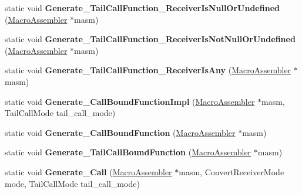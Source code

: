 \begin{DoxyCompactItemize}
\item 
static void {\bfseries Generate\+\_\+\+Tail\+Call\+Function\+\_\+\+Receiver\+Is\+Null\+Or\+Undefined} (\hyperlink{classv8_1_1internal_1_1_macro_assembler}{Macro\+Assembler} $\ast$masm)\hypertarget{classv8_1_1internal_1_1_builtins_a20d221a18dbbe7fc40eb2bc910c1be9d}{}\label{classv8_1_1internal_1_1_builtins_a20d221a18dbbe7fc40eb2bc910c1be9d}

\item 
static void {\bfseries Generate\+\_\+\+Tail\+Call\+Function\+\_\+\+Receiver\+Is\+Not\+Null\+Or\+Undefined} (\hyperlink{classv8_1_1internal_1_1_macro_assembler}{Macro\+Assembler} $\ast$masm)\hypertarget{classv8_1_1internal_1_1_builtins_a75a6654464f180afcf6d9e6d1401036d}{}\label{classv8_1_1internal_1_1_builtins_a75a6654464f180afcf6d9e6d1401036d}

\item 
static void {\bfseries Generate\+\_\+\+Tail\+Call\+Function\+\_\+\+Receiver\+Is\+Any} (\hyperlink{classv8_1_1internal_1_1_macro_assembler}{Macro\+Assembler} $\ast$masm)\hypertarget{classv8_1_1internal_1_1_builtins_a6d19b4c8d097355fb3c0133ff6f9ae70}{}\label{classv8_1_1internal_1_1_builtins_a6d19b4c8d097355fb3c0133ff6f9ae70}

\item 
static void {\bfseries Generate\+\_\+\+Call\+Bound\+Function\+Impl} (\hyperlink{classv8_1_1internal_1_1_macro_assembler}{Macro\+Assembler} $\ast$masm, Tail\+Call\+Mode tail\+\_\+call\+\_\+mode)\hypertarget{classv8_1_1internal_1_1_builtins_aa351e4593f7806df1f67c5199a4dbfa8}{}\label{classv8_1_1internal_1_1_builtins_aa351e4593f7806df1f67c5199a4dbfa8}

\item 
static void {\bfseries Generate\+\_\+\+Call\+Bound\+Function} (\hyperlink{classv8_1_1internal_1_1_macro_assembler}{Macro\+Assembler} $\ast$masm)\hypertarget{classv8_1_1internal_1_1_builtins_a1ef5b7c140a79dca743d7f17ae4e3cca}{}\label{classv8_1_1internal_1_1_builtins_a1ef5b7c140a79dca743d7f17ae4e3cca}

\item 
static void {\bfseries Generate\+\_\+\+Tail\+Call\+Bound\+Function} (\hyperlink{classv8_1_1internal_1_1_macro_assembler}{Macro\+Assembler} $\ast$masm)\hypertarget{classv8_1_1internal_1_1_builtins_a3e8d3efdcf4a500fd247ad2998d0a575}{}\label{classv8_1_1internal_1_1_builtins_a3e8d3efdcf4a500fd247ad2998d0a575}

\item 
static void {\bfseries Generate\+\_\+\+Call} (\hyperlink{classv8_1_1internal_1_1_macro_assembler}{Macro\+Assembler} $\ast$masm, Convert\+Receiver\+Mode mode, Tail\+Call\+Mode tail\+\_\+call\+\_\+mode)\hypertarget{classv8_1_1internal_1_1_builtins_ab240e966f7e7d12cdb5da049f1d289e8}{}\label{classv8_1_1internal_1_1_builtins_ab240e966f7e7d12cdb5da049f1d289e8}


\end{DoxyCompactItemize}
